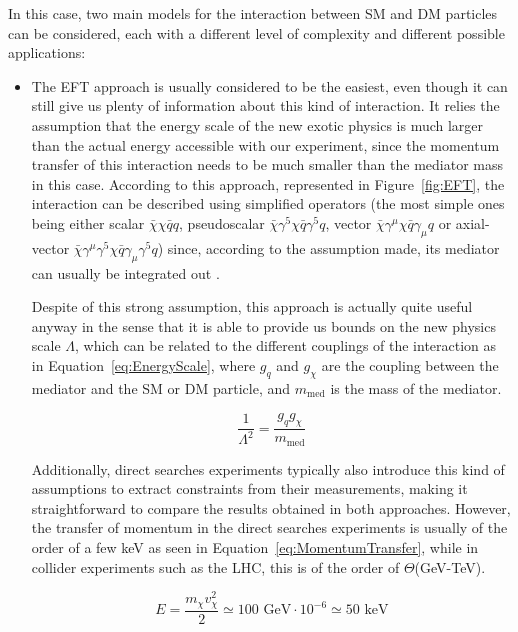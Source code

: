 \documentclass[a4paper, 10pt, openright]{report}
\begin{document}
In this case, two main models for the interaction between \ac{SM} and \ac{DM} particles can be considered, each with a different level of complexity and different possible applications:

\begin{itemize}
\item The \ac{EFT} approach is usually considered to be the easiest, even though it can still give us plenty of information about this kind of interaction. It relies the assumption that the energy scale of the new exotic physics is much larger than the actual energy accessible with our experiment, since the momentum transfer of this interaction needs to be much smaller than the mediator mass in this case. According to this approach, represented in Figure~\ref{fig:EFT}, the interaction can be described using simplified operators (the most simple ones being either scalar $\bar \chi \chi \bar q q$, pseudoscalar $\bar \chi \gamma^5 \chi \bar q \gamma^5 q$, vector $\bar \chi \gamma^{\mu} \chi \bar q \gamma_\mu q$ or axial-vector $\bar \chi \gamma^\mu \gamma^5 \chi \bar q \gamma_\mu \gamma^5 q$) since, according to the assumption made, its mediator can usually be integrated out \cite{ColliderSearches}. 

Despite of this strong assumption, this approach is actually quite useful anyway in the sense that it is able to provide us bounds on the new physics scale $\Lambda$, which can be related to the different couplings of the interaction as in Equation~\ref{eq:EnergyScale}, where $g_q$ and $g_\chi$ are the coupling between the mediator and the \ac{SM} or \ac{DM} particle, and $m_{\text{med}}$ is the mass of the mediator. 

\begin{equation}
\label{eq:EnergyScale}
\frac{1}{\Lambda^2} = \frac{g_q g_\chi}{m_{\text{med}}}
\end{equation}

Additionally, direct searches experiments typically also introduce this kind of assumptions to extract constraints from their measurements, making it straightforward to compare the results obtained in both approaches. However, the transfer of momentum in the direct searches experiments is usually of the order of a few keV as seen in Equation~\ref{eq:MomentumTransfer}, while in collider experiments such as the \ac{LHC}, this is of the order of $\Theta$(GeV-TeV).

\begin{equation}
\label{eq:MomentumTransfer}
E = \frac{m_\chi v_\chi^2}{2} \simeq 100 \text{ GeV} \cdot 10^{-6} \simeq 50 \text{ keV}
\end{equation}


\end{itemize}
\end{document}
